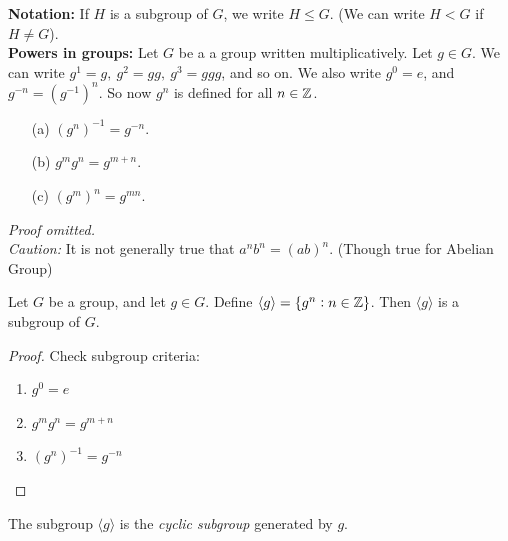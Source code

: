 \noindent \textbf{Notation:} If $H$ is a subgroup of $G$, we write $H \leq G$. (We can write $H < G$ if $H \neq G$).\\

\noindent \textbf{Powers in groups:} Let $G$ be a a group written multiplicatively. Let $g \in G$. We can write $g^1 = g, ~ g^2 = gg,~ g^3 = ggg$, and so on. We also write $g^{0} = e$, and $g^{-n} = (g^{-1})^n$. So now $g^n$ is defined for all $n \in \mathbb{Z}$.\\

\begin{proposition}\begin{itemize}
 \item[(a)] $(g^n)^{-1} = g^{-n}$.
 \item[(b)] $g^mg^n = g^{m+n}$.
 \item[(c)] $(g^m)^n = g^{mn}$.	
 \end{itemize}
 \end{proposition}
 
 \emph{Proof omitted.}\\
 
 \noindent \textit{Caution:} It is not generally true that $a^nb^n = (ab)^n$. (Though true for Abelian Group)\\
 
\begin{proposition} Let $G$ be a group, and let $g \in G$. Define $\langle g\rangle  = \{g^n : n \in \mathbb{Z}\}$. Then $\langle g\rangle $  is a subgroup of $G$.	
\end{proposition}

 \begin{proof}
 	Check subgroup criteria: \begin{enumerate}
 \item $g^{0} = e$
 \item $g^mg^n = g^{m+n}$
 \item $(g^n)^{-1} = g^{-n}$ \qedhere 
 \end{enumerate}\end{proof}\vspace*{10pt}
 

\begin{definition} The subgroup $\langle g \rangle$ is the \emph{cyclic subgroup} generated by $g$.
	
\end{definition}\vspace*{10pt}

